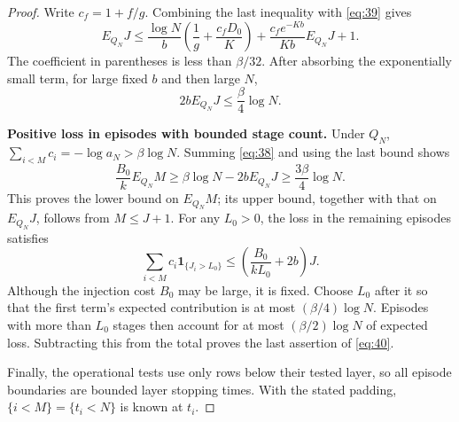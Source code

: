 \begin{proof}
Write \(c_f=1+f/g\). Combining the last inequality with
\eqref{eq:39} gives
\[
 E_{Q_N}J\le
 \frac{\log N}{b}\left(\frac1g+\frac{c_fD_0}{K}\right)
 +\frac{c_fe^{-Kb}}{Kb}E_{Q_N}J+1.
\]
The coefficient in parentheses is less than \(\beta/32\). After
absorbing the exponentially small term, for large fixed \(b\) and
then large \(N\),
\[
 2bE_{Q_N}J\le\frac\beta4\log N.
\]

\smallskip\noindent\textbf{Positive loss in episodes with bounded stage count.}
Under \(Q_N\),
\(\sum_{i<M}c_i=-\log a_N>\beta\log N\). Summing
\eqref{eq:38} and using the last bound shows
\[
 \frac{B_0}{k}E_{Q_N}M
 \ge\beta\log N-2bE_{Q_N}J
 \ge\frac{3\beta}{4}\log N.
\]
This proves the lower bound on \(E_{Q_N}M\); its upper bound, together
with that on \(E_{Q_N}J\), follows from \(M\le J+1\).
For any \(L_0>0\), the loss in the remaining episodes satisfies
\[
 \sum_{i<M}c_i\mathbf1_{\{J_i>L_0\}}
 \le\left(\frac{B_0}{kL_0}+2b\right)J.
\]
Although the injection cost \(B_0\) may be large, it is fixed. Choose
\(L_0\) after it so that the first term's expected contribution is
at most \((\beta/4)\log N\). Episodes with more than \(L_0\)
stages then account for at most \((\beta/2)\log N\) of expected
loss. Subtracting this from the total proves the last assertion of
\eqref{eq:40}.

Finally, the operational tests use only rows below their tested layer,
so all episode boundaries are bounded layer stopping times. With the
stated padding, \(\{i<M\}=\{t_i<N\}\) is known at \(t_i\).
\end{proof}
